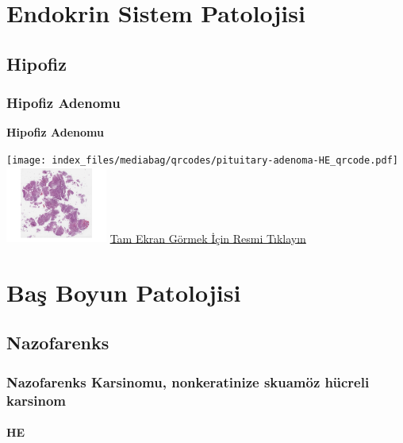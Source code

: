\documentclass[
  letterpaper,
  DIV=11,
  numbers=noendperiod]{scrreprt}
\begin{document}
\part{Endokrin Sistem Patolojisi}

\hypertarget{sec-hipofiz}{%
\chapter{Hipofiz}\label{sec-hipofiz}}

\hypertarget{sec-hipofiz-adenomu}{%
\section{Hipofiz Adenomu}\label{sec-hipofiz-adenomu}}

\textbf{Hipofiz Adenomu}

\texttt{[image: index\_files/mediabag/qrcodes/pituitary-adenoma-HE\_qrcode.pdf]}
\href{https://images.patolojiatlasi.com/pituitary-adenoma/HE.html}{\includegraphics[width=0.25\textwidth,height=\textheight]{./screenshots/thumbnail_pituitary-adenoma.png}}
\href{https://images.patolojiatlasi.com/pituitary-adenoma/HE.html}{Tam
Ekran Görmek İçin Resmi Tıklayın}

\part{Baş Boyun Patolojisi}

\hypertarget{sec-nazofarenks}{%
\chapter{Nazofarenks}\label{sec-nazofarenks}}

\hypertarget{sec-nazofarenks-karsinomu-nonkeratinize-skuamoz-hucreli-karsinom}{%
\section{Nazofarenks Karsinomu, nonkeratinize skuamöz hücreli
karsinom}\label{sec-nazofarenks-karsinomu-nonkeratinize-skuamoz-hucreli-karsinom}}

\hypertarget{he-10}{%
\subsection{HE}\label{he-10}}
\end{document}
